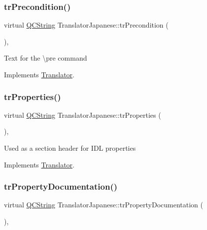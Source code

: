 \subsubsection{\texorpdfstring{trPrecondition()}{trPrecondition()}}
{\footnotesize\ttfamily virtual \mbox{\hyperlink{class_q_c_string}{Q\+C\+String}} Translator\+Japanese\+::tr\+Precondition (\begin{DoxyParamCaption}{ }\end{DoxyParamCaption})\hspace{0.3cm}{\ttfamily [inline]}, {\ttfamily [virtual]}}

Text for the \textbackslash{}pre command 

Implements \mbox{\hyperlink{class_translator}{Translator}}.

\mbox{\label{class_translator_japanese_ae003f3fae0dbdbdd541274d665804a45}} 
\subsubsection{\texorpdfstring{trProperties()}{trProperties()}}
{\footnotesize\ttfamily virtual \mbox{\hyperlink{class_q_c_string}{Q\+C\+String}} Translator\+Japanese\+::tr\+Properties (\begin{DoxyParamCaption}{ }\end{DoxyParamCaption})\hspace{0.3cm}{\ttfamily [inline]}, {\ttfamily [virtual]}}

Used as a section header for I\+DL properties 

Implements \mbox{\hyperlink{class_translator}{Translator}}.

\mbox{\label{class_translator_japanese_a45c643c6e836843a45bf02695217a98a}} 
\subsubsection{\texorpdfstring{trPropertyDocumentation()}{trPropertyDocumentation()}}
{\footnotesize\ttfamily virtual \mbox{\hyperlink{class_q_c_string}{Q\+C\+String}} Translator\+Japanese\+::tr\+Property\+Documentation (\begin{DoxyParamCaption}{ }\end{DoxyParamCaption})\hspace{0.3cm}{\ttfamily [inline]}, {\ttfamily [virtual]}}

